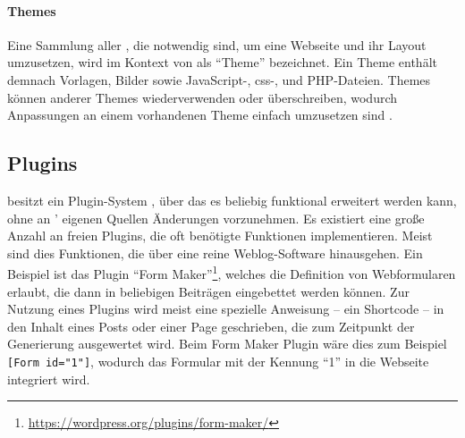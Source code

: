         \paragraph*{Themes}
        Eine Sammlung aller {\resources}, die notwendig sind, um
        eine Webseite und ihr Layout umzusetzen,
        wird im Kontext von {\wordpress} als "`Theme"' bezeichnet.
        Ein Theme enthält demnach Vorlagen, Bilder sowie
        JavaScript-, \gls{css}-, und PHP-Dateien.
        Themes können {\resources} anderer Themes wiederverwenden oder überschreiben,
        wodurch Anpassungen an einem vorhandenen Theme einfach umzusetzen sind
        \cite[Kapitel "`Using Themes"']{wordpress:codex}.

    \subsection{Plugins}
        \label{section:wordpressPlugins}
        {\wordpress} besitzt ein Plugin-System \cite[Kapitel "`Plugins"']{wordpress:codex},
        über das es beliebig funktional erweitert werden kann,
        ohne an {\wordpress}' eigenen Quellen Änderungen vorzunehmen.
        Es existiert eine große Anzahl an freien Plugins,
        die oft benötigte Funktionen implementieren.
        Meist sind dies Funktionen, die über eine reine Weblog-Software hinausgehen.
        Ein Beispiel ist das Plugin
        "`Form Maker"'\footnote{\url{https://wordpress.org/plugins/form-maker/}},
        welches die Definition von Webformularen erlaubt,
        die dann in beliebigen Beiträgen eingebettet werden können.
        Zur Nutzung eines Plugins wird meist eine spezielle Anweisung -- ein Shortcode \cite[Kapitel "`Shortcode API"']{wordpress:codex} --
        in den Inhalt eines Posts oder einer Page geschrieben,
        die zum Zeitpunkt der Generierung ausgewertet wird.
        Beim Form Maker Plugin wäre dies zum Beispiel \texttt{[Form id="1"]},
        wodurch das Formular mit der Kennung "`1"' in die Webseite integriert wird.
